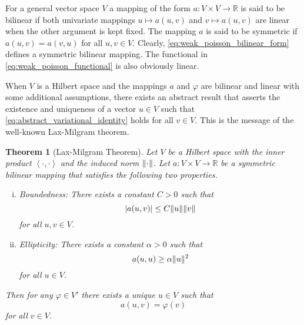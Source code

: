 \documentclass[english, 12pt, a4paper, sci, utf8, a-2b, online]{aaltothesis}
\theoremstyle{definition}
\theoremstyle{plain}
\newtheorem{theorem}{Theorem}[section]
\DeclarePairedDelimiter\abs{\lvert}{\rvert}
\DeclarePairedDelimiter\norm{\lVert}{\rVert}
\newcommand*{\innerprod}[2]{\left\langle #1, #2 \right\rangle}
\numberwithin{equation}{section}
\begin{document}
For a general vector space $V$ a mapping of the form $a: V \times V \to \mathbb{R}$
is said to be bilinear if both univariate mappings
$u \mapsto a(u,v)$ and $v \mapsto a(u,v)$ are linear when the other argument
is kept fixed. The mapping $a$ is said to be symmetric if
$a(u,v) = a(v,u)$ for all $u,v \in V$.
Clearly, \eqref{eq:weak_poisson_bilinear_form} defines a symmetric bilinear 
mapping. The functional in \eqref{eq:weak_poisson_functional}
is also obviously linear.

When $V$ is a Hilbert space and the mappings $a$ and $\varphi$ are bilinear
and linear with some additional assumptions, there exists an abstract result
that asserts the existence and uniqueness of a vector $u \in V$ such that
\eqref{eq:abstract_variational_identity} holds for all $v \in V$.
This is the message of the well-known Lax-Milgram theorem.
\begin{theorem}[Lax-Milgram Theorem]
    \label{thm:lax_milgram}
    Let $V$ be a Hilbert space with the inner product $\innerprod{\cdot}{\cdot}$
    and the induced norm $\norm{\cdot}$.
    Let $a: V \times V \to \mathbb{R}$ be a symmetric bilinear
    mapping that satisfies the following two properties.
    \begin{enumerate}[(i)]
        \item Boundedness: There exists a constant $C > 0$ such that
        \begin{equation*}
            \abs{a(u,v)} \leq C \norm{u} \norm{v}
        \end{equation*}
        for all $u,v \in V$.
        \item Ellipticity: There exists a constant $\alpha > 0$ such that
        \begin{equation*}
            a(u,u) \geq \alpha \norm{u}^2
        \end{equation*}
        for all $u \in V$.
    \end{enumerate}
    Then for any $\varphi \in V'$ there exists a unique $u \in V$ such that
    \begin{equation*}
        a(u,v) = \varphi(v)
    \end{equation*}
    for all $v \in V$.
\end{theorem}
\end{document}
